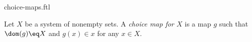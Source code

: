 \documentclass{naproche-library}
\begin{document}
\begin{smodule}[title=Choice Maps]{choice-maps.ftl}


\begin{definition}[forthel,id=FOUNDATIONS_10_1352015487625913]
  Let $X$ be a system of nonempty sets.
  A \emph{choice map for $X$} is a map $g$ such that $\dom(g) \eq X$ and $g(x) \in x$ for any $x \in X$.
\end{definition}
\end{smodule}
\end{document}
